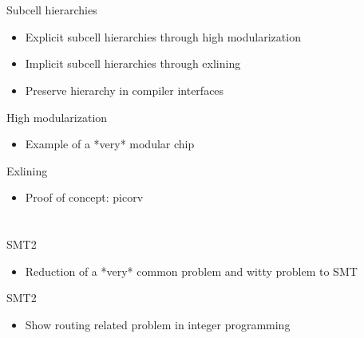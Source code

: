 \documentclass[9pt]{beamer}
\begin{document}
\section[Decomposition]{}
\begin{frame}{Subcell hierarchies}
	\begin{itemize}
        \setlength\itemsep{1em}
		\item Explicit subcell hierarchies through high modularization
		\item Implicit subcell hierarchies through exlining
		\item Preserve hierarchy in compiler interfaces
	\end{itemize}
\end{frame}

\begin{frame}{High modularization}
	\begin{itemize}
        \setlength\itemsep{1em}
		\item Example of a *very* modular chip
	\end{itemize}
\end{frame}

\begin{frame}{Exlining}
	\begin{itemize}
        \setlength\itemsep{1em}
		\item Proof of concept: picorv
	\end{itemize}
\end{frame}

\section[SMT]{}
\begin{frame}{SMT2}
	\begin{itemize}
        \setlength\itemsep{1em}
		\item Reduction of a *very* common problem and witty problem to SMT
	\end{itemize}
\end{frame}

\begin{frame}{SMT2}
	\begin{itemize}
        \setlength\itemsep{1em}
		\item Show routing related problem in integer programming
	\end{itemize}
\end{frame}
\end{document}
